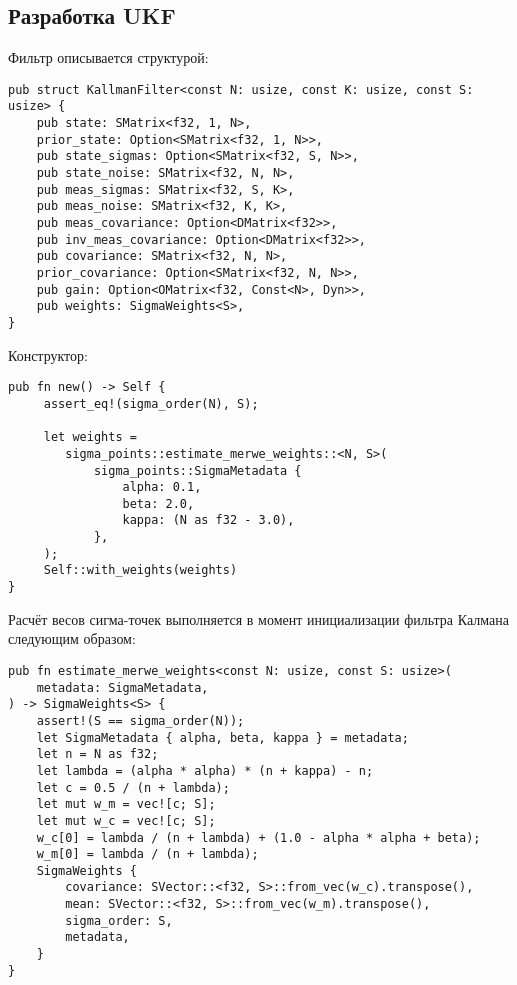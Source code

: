 
\subsection{Разработка UKF}
Фильтр описывается структурой:
\begin{lstlisting}
pub struct KallmanFilter<const N: usize, const K: usize, const S: usize> {
    pub state: SMatrix<f32, 1, N>,
    prior_state: Option<SMatrix<f32, 1, N>>,
    pub state_sigmas: Option<SMatrix<f32, S, N>>,
    pub state_noise: SMatrix<f32, N, N>,
    pub meas_sigmas: SMatrix<f32, S, K>,
    pub meas_noise: SMatrix<f32, K, K>,
    pub meas_covariance: Option<DMatrix<f32>>,
    pub inv_meas_covariance: Option<DMatrix<f32>>,
    pub covariance: SMatrix<f32, N, N>,
    prior_covariance: Option<SMatrix<f32, N, N>>,
    pub gain: Option<OMatrix<f32, Const<N>, Dyn>>,
    pub weights: SigmaWeights<S>,
}
\end{lstlisting}


Конструктор:
\begin{lstlisting}
pub fn new() -> Self {
     assert_eq!(sigma_order(N), S);

     let weights =
        sigma_points::estimate_merwe_weights::<N, S>(
            sigma_points::SigmaMetadata {
                alpha: 0.1,
                beta: 2.0,
                kappa: (N as f32 - 3.0),
            },
     );
     Self::with_weights(weights)
}

\end{lstlisting}

Расчёт весов сигма-точек выполняется в момент инициализации фильтра Калмана
следующим образом:
\begin{lstlisting}
pub fn estimate_merwe_weights<const N: usize, const S: usize>(
    metadata: SigmaMetadata,
) -> SigmaWeights<S> {
    assert!(S == sigma_order(N));
    let SigmaMetadata { alpha, beta, kappa } = metadata;
    let n = N as f32;
    let lambda = (alpha * alpha) * (n + kappa) - n;
    let c = 0.5 / (n + lambda);
    let mut w_m = vec![c; S];
    let mut w_c = vec![c; S];
    w_c[0] = lambda / (n + lambda) + (1.0 - alpha * alpha + beta);
    w_m[0] = lambda / (n + lambda);
    SigmaWeights {
        covariance: SVector::<f32, S>::from_vec(w_c).transpose(),
        mean: SVector::<f32, S>::from_vec(w_m).transpose(),
        sigma_order: S,
        metadata,
    }
}

\end{lstlisting}

